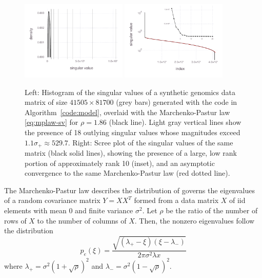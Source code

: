 \documentclass[review]{siamart0516}
\begin{document}
\begin{figure}

\includegraphics[width=0.45\textwidth]{fig/synthetic/fig-empirical-density}
%
\includegraphics[width=0.45\textwidth]{fig/synthetic/fig-empirical-scree}

\caption{Left: Histogram of the singular values of a synthetic genomics data
matrix of size $41505\times81700$ (grey bars) generated with the code in
Algorithm~\ref{code:model}, overlaid with the
Marchenko-Pastur law \eqref{eq:mplaw-sv} for $\rho = 1.86$ (black line).
Light gray vertical lines show the
presence of 18 outlying singular values whose magnitudes exceed
$1.1\sigma_+ \approx 529.7$.
Right: Scree plot of the singular values of the same matrix
(black solid lines), showing the presence of a large, low rank portion
of approximately rank 10 (inset), and an asymptotic convergence to the same
Marchenko-Pastur law (red dotted line).
\label{fig:empirical-spectrum}
}
\end{figure}


The Marchenko-Pastur law describes the distribution of governs the eigenvalues
of a random covariance matrix $Y=XX^T$ formed from a data matrix $X$
of iid elements with mean 0 and finite variance $\sigma^2$.
Let $\rho$ be the ratio of the number of rows of $X$ to the number of columns of
$X$. Then, the nonzero eigenvalues follow the distribution
%
\begin{equation}
    \label{eq:mplaw-ev}
    p_e(\xi) = \frac {\sqrt{(\lambda_+-\xi)(\xi-\lambda_-)}} {2 \pi \sigma^2 \lambda x}
\end{equation}
%
where
$\lambda_+ = \sigma^2(1+\sqrt{\rho})^2$ and
$\lambda_- = \sigma^2(1-\sqrt{\rho})^2$.
\end{document}
